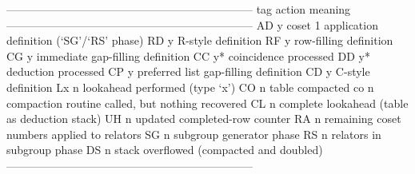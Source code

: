 \begintt
------------------------------------------------------------------
tag   action      meaning
------------------------------------------------------------------
AD         y      coset 1 application definition (`SG'/`RS' phase)
RD         y      R-style definition
RF         y      row-filling definition
CG         y      immediate gap-filling definition
CC         y*     coincidence processed
DD         y*     deduction processed
CP         y      preferred list gap-filling definition
CD         y      C-style definition
Lx         n      lookahead performed (type `x')
CO         n      table compacted
co         n      compaction routine called, but nothing recovered
CL         n      complete lookahead (table as deduction stack)
UH         n      updated completed-row counter
RA         n      remaining coset numbers applied to relators
SG         n      subgroup generator phase
RS         n      relators in subgroup phase
DS         n      stack overflowed (compacted and doubled)
------------------------------------------------------------------
\endtt


